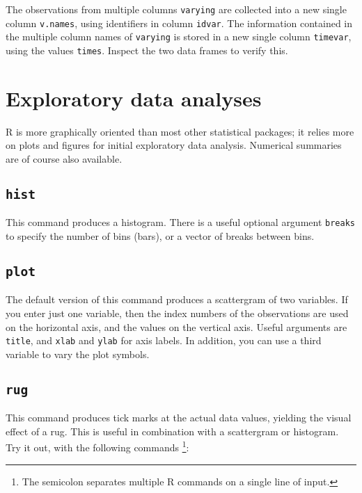 \documentclass[
]{book}
\begin{document}
The observations from multiple columns \texttt{varying} are
collected into a new single column \texttt{v.names}, using
identifiers in column \texttt{idvar}. The
information contained in the multiple column names of
\texttt{varying} is stored in a new single column
\texttt{timevar}, using the values \texttt{times}.
Inspect the two data frames to verify this.

\hypertarget{ch-EDA}{%
\chapter{Exploratory data analyses}\label{ch-EDA}}

R is more graphically oriented than most other
statistical packages; it relies more on plots and figures for initial
exploratory data analysis. Numerical summaries are of course also
available.

\hypertarget{hist}{%
\section{\texorpdfstring{\texttt{hist}}{hist}}\label{hist}}

This command produces a histogram. There is a useful optional
argument \texttt{breaks} to specify the number of
bins (bars), or a vector of breaks between bins.

\hypertarget{plot}{%
\section{\texorpdfstring{\texttt{plot}}{plot}}\label{plot}}

The default version of this command produces a scattergram of two
variables. If you enter just one variable, then the index numbers of
the observations are used on the horizontal axis, and the values on
the vertical axis. Useful arguments are
\texttt{title}, and \texttt{xlab}
and \texttt{ylab} for axis labels. In addition, you
can use a third variable to vary the plot symbols.

\hypertarget{rug}{%
\section{\texorpdfstring{\texttt{rug}}{rug}}\label{rug}}

This command produces tick marks at the actual data values, yielding
the visual effect of a rug. This is useful in combination with a
scattergram or histogram. Try it out, with the following
commands \footnote{The semicolon separates multiple R commands on a single line of input.}:
\end{document}
